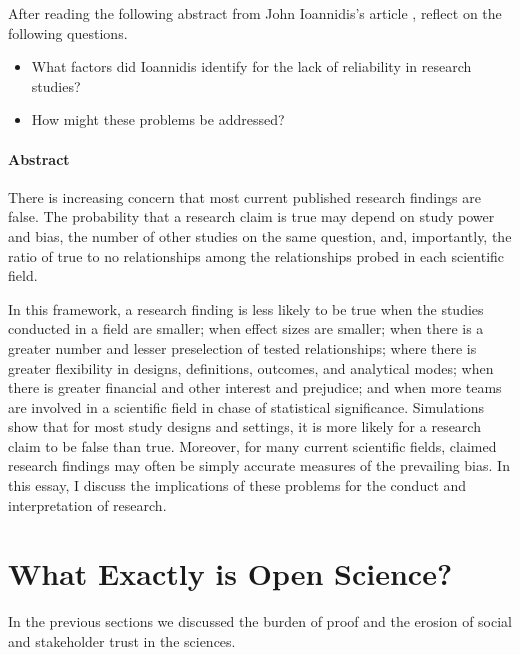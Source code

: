 \documentclass[
]{book}
\providecommand{\tightlist}{%
  \setlength{\itemsep}{0pt}\setlength{\parskip}{0pt}}
\begin{document}
After reading the following abstract from John Ioannidis's article \citep{ioannidis_why_2005}, reflect on the following questions.

\begin{itemize}
\tightlist
\item
  What factors did Ioannidis identify for the lack of reliability in research studies?
\item
  How might these problems be addressed?
\end{itemize}

\hypertarget{abstract-1}{%
\paragraph*{Abstract}\label{abstract-1}}

There is increasing concern that most current published research findings are false. The probability that a research claim is true may depend on study power and bias, the number of other studies on the same question, and, importantly, the ratio of true to no relationships among the relationships probed in each scientific field.

In this framework, a research finding is less likely to be true when the studies conducted in a field are smaller; when effect sizes are smaller; when there is a greater number and lesser preselection of tested relationships; where there is greater flexibility in designs, definitions, outcomes, and analytical modes; when there is greater financial and other interest and prejudice; and when more teams are involved in a scientific field in chase of statistical significance. Simulations show that for most study designs and settings, it is more likely for a research claim to be false than true. Moreover, for many current scientific fields, claimed research findings may often be simply accurate measures of the prevailing bias. In this essay, I discuss the implications of these problems for the conduct and interpretation of research.

\hypertarget{what-exactly-is-open-science}{%
\section{What Exactly is Open Science?}\label{what-exactly-is-open-science}}

In the previous sections we discussed the burden of proof and the erosion of social and stakeholder trust in the sciences.
\end{document}
